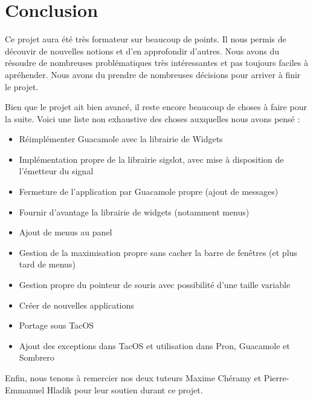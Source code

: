 \section{Conclusion}

Ce projet aura été très formateur sur beaucoup de points.
Il nous permis de découvir de nouvelles notions et d'en approfondir d'autres.
Nous avons du résoudre de nombreuses problématiques très intéressantes et pas toujours faciles à apréhender.
Nous avons du prendre de nombreuses décisions pour arriver à finir le projet.

Bien que le projet ait bien avancé, il reste encore beaucoup de choses à faire pour la suite. Voici une liste non exhaustive des choses auxquelles nous avons pensé :

\begin{itemize}
  \item Réimplémenter Guacamole avec la librairie de Widgets
  \item Implémentation propre de la librairie sigslot, avec mise à disposition de l'émetteur du signal
  \item Fermeture de l'application par Guacamole propre (ajout de messages)
  \item Fournir d'avantage la librairie de widgets (notamment menus)
  \item Ajout de menus au panel
  \item Gestion de la maximisation propre sans cacher la barre de fenêtres (et plus tard de menus)
  \item Gestion propre du pointeur de souris avec possibilité d'une taille variable
  \item Créer de nouvelles applications
  \item Portage sous TacOS
  \item Ajout des exceptions dans TacOS et utilisation dans Pron, Guacamole et Sombrero
\end{itemize}

Enfin, nous tenons à remercier nos deux tuteurs Maxime Chéramy et Pierre-Emmanuel Hladik pour leur soutien durant ce projet.
